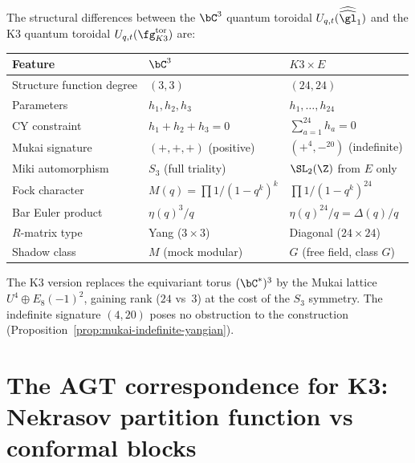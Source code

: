 \begin{remark}
\label{rem:k3-qt-vs-c3}
The structural differences between the $\bC^3$ quantum toroidal
$U_{q,t}(\widehat{\widehat{\gl}}_1)$ and the K3 quantum toroidal
$U_{q,t}(\fg_{K3}^{\mathrm{tor}})$ are:
\begin{center}
\small
\renewcommand{\arraystretch}{1.3}
\begin{tabular}{lll}
\toprule
\textbf{Feature} & \textbf{$\bC^3$} & \textbf{$K3 \times E$} \\
\midrule
Structure function degree & $(3,3)$ & $(24,24)$ \\
Parameters & $h_1, h_2, h_3$ & $h_1, \ldots, h_{24}$ \\
CY constraint & $h_1 + h_2 + h_3 = 0$ & $\sum_{a=1}^{24} h_a = 0$ \\
Mukai signature & $(+,+,+)$ (positive) & $(+^4, -^{20})$ (indefinite) \\
Miki automorphism & $S_3$ (full triality) & $\SL_2(\Z)$ from $E$ only \\
Fock character & $M(q) = \prod 1/(1-q^k)^k$ & $\prod 1/(1-q^k)^{24}$ \\
Bar Euler product & $\eta(q)^3/q$ & $\eta(q)^{24}/q = \Delta(q)/q$ \\
$R$-matrix type & Yang ($3 \times 3$) & Diagonal ($24 \times 24$) \\
Shadow class & $M$ (mock modular) & $G$ (free field, class $G$) \\
\bottomrule
\end{tabular}
\end{center}
The K3 version replaces the equivariant torus $(\bC^*)^3$ by the Mukai
lattice $U^4 \oplus E_8(-1)^2$, gaining rank ($24$ vs~$3$) at the cost
of the $S_3$ symmetry. The indefinite signature $(4,20)$ poses no
obstruction to the construction (Proposition~\ref{prop:mukai-indefinite-yangian}).
\end{remark}

\section{The AGT correspondence for K3: Nekrasov partition function vs conformal blocks}
\label{sec:k3e-agt}

